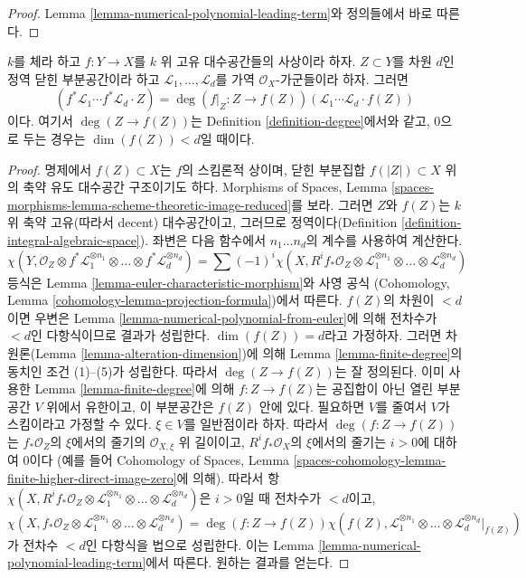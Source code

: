 \begin{proof}
Lemma \ref{lemma-numerical-polynomial-leading-term}와 정의들에서 바로 따른다.
\end{proof}

\begin{lemma}
\label{lemma-intersection-number-and-pullback}
$k$를 체라 하고 $f : Y \to X$를 $k$ 위 고유 대수공간들의 사상이라 하자.
$Z \subset Y$를 차원 $d$인 정역 닫힌 부분공간이라 하고
$\mathcal{L}_1, \ldots, \mathcal{L}_d$를 가역 $\mathcal{O}_X$-가군들이라
하자. 그러면
$$
(f^*\mathcal{L}_1 \cdots f^*\mathcal{L}_d \cdot Z) =
\deg(f|_Z : Z \to f(Z)) (\mathcal{L}_1 \cdots \mathcal{L}_d \cdot f(Z))
$$
이다. 여기서 $\deg(Z \to f(Z))$는 Definition \ref{definition-degree}에서와
같고, $0$으로 두는 경우는 $\dim(f(Z)) < d$일 때이다.
\end{lemma}

\begin{proof}
명제에서 $f(Z) \subset X$는 $f$의 스킴론적 상이며, 닫힌 부분집합
$f(|Z|) \subset X$ 위의 축약 유도 대수공간 구조이기도 하다. Morphisms of
Spaces, Lemma \ref{spaces-morphisms-lemma-scheme-theoretic-image-reduced}를
보라.
그러면 $Z$와 $f(Z)$는 $k$ 위 축약 고유(따라서 decent) 대수공간이고,
그러므로 정역이다(Definition \ref{definition-integral-algebraic-space}).
좌변은 다음 함수에서 $n_1 \ldots n_d$의 계수를 사용하여 계산한다.
$$
\chi(Y, \mathcal{O}_Z \otimes f^*\mathcal{L}_1^{\otimes n_1} \otimes
\ldots \otimes f^*\mathcal{L}_d^{\otimes n_d}) =
\sum (-1)^i
\chi(X, R^if_*\mathcal{O}_Z \otimes
\mathcal{L}_1^{\otimes n_1} \otimes \ldots \otimes
\mathcal{L}_d^{\otimes n_d})
$$
등식은 Lemma \ref{lemma-euler-characteristic-morphism}와 사영 공식
(Cohomology, Lemma \ref{cohomology-lemma-projection-formula})에서 따른다.
$f(Z)$의 차원이 $< d$이면 우변은 Lemma
\ref{lemma-numerical-polynomial-from-euler}에 의해 전차수가 $< d$인
다항식이므로 결과가 성립한다. $\dim(f(Z)) = d$라고 가정하자. 그러면
차원론(Lemma \ref{lemma-alteration-dimension})에 의해 Lemma
\ref{lemma-finite-degree}의 동치인 조건 (1)--(5)가 성립한다. 따라서
$\deg(Z \to f(Z))$는 잘 정의된다. 이미 사용한 Lemma
\ref{lemma-finite-degree}에 의해 $f : Z \to f(Z)$는 공집합이 아닌 열린
부분공간 $V$ 위에서 유한이고, 이 부분공간은 $f(Z)$ 안에 있다. 필요하면
$V$를 줄여서 $V$가 스킴이라고
가정할 수 있다. $\xi \in V$를 일반점이라 하자. 따라서
$\deg(f : Z \to f(Z))$는 $f_*\mathcal{O}_Z$의 $\xi$에서의 줄기의
$\mathcal{O}_{X, \xi}$ 위 길이이고,
$R^if_*\mathcal{O}_X$의 $\xi$에서의 줄기는 $i > 0$에 대하여 0이다
(예를 들어 Cohomology of Spaces, Lemma
\ref{spaces-cohomology-lemma-finite-higher-direct-image-zero}에 의해). 따라서
항 $\chi(X, R^if_*\mathcal{O}_Z \otimes
\mathcal{L}_1^{\otimes n_1} \otimes \ldots \otimes
\mathcal{L}_d^{\otimes n_d})$은 $i > 0$일 때 전차수가 $< d$이고,
$$
\chi(X, f_*\mathcal{O}_Z \otimes
\mathcal{L}_1^{\otimes n_1} \otimes \ldots \otimes
\mathcal{L}_d^{\otimes n_d})
=
\deg(f : Z \to f(Z)) \chi(f(Z),
\mathcal{L}_1^{\otimes n_1} \otimes \ldots \otimes
\mathcal{L}_d^{\otimes n_d}|_{f(Z)})
$$
가 전차수 $< d$인 다항식을 법으로 성립한다. 이는 Lemma
\ref{lemma-numerical-polynomial-leading-term}에서 따른다. 원하는 결과를
얻는다.
\end{proof}

